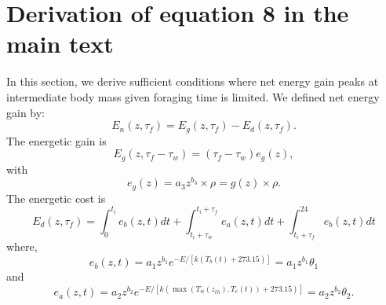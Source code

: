 \documentclass[12pt]{article}
\begin{document}
\section{Derivation of  equation 8 in the main text}
In this section, we derive sufficient conditions where net energy gain peaks at intermediate body mass given foraging time is limited.
We defined net energy gain by:
\begin{equation} \label{eq:main}
	E_n(z, \tau_f) = E_g(z,\tau_f) - E_d(z, \tau_f).
\end{equation}
The energetic gain is
\[
	E_g(z,\tau_f - \tau_w) = (\tau_f - \tau_w) e_g(z),
\]
with
\begin{equation} \label{eq:eg}
	e_g(z) = a_3 z^{b_3} \times \rho  = g(z) \times \rho.
\end{equation}
%
The energetic cost is
\begin{equation} \label{eq:ed}
	E_d(z, \tau_f) = \int_0^{t_i} e_b(z, t) dt + \int_{t_i + \tau_w}^{t_i + \tau_f } e_a(z,t) dt + \int_{t_i+\tau_f}^{24} e_b(z, t) dt
\end{equation}
where,
\begin{equation} \label{eq:eb}
	e_b(z, t) = a_1 z^{b_1} e^{-E/[k (T_b(t)+ 273.15)]} =  a_1 z^{b_1} \theta_1
\end{equation}
and
\begin{equation} \label{eq:ea}
	e_a(z,t) = a_2 z^{b_2}  e^{-E/[k (\max(T_w(z_{th}), T_e(t))+ 273.15)]} =  a_2 z^{b_2} \theta_2.
\end{equation}
\end{document}
